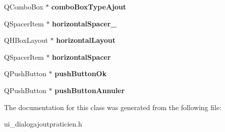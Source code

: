 \begin{DoxyCompactItemize}
\item 
\hypertarget{classUi__DialogAjoutPraticien_a2e7a425602b6e23d6068265cfcc4d961}{Q\-Combo\-Box $\ast$ {\bfseries combo\-Box\-Type\-Ajout}}\label{classUi__DialogAjoutPraticien_a2e7a425602b6e23d6068265cfcc4d961}

\item 
\hypertarget{classUi__DialogAjoutPraticien_aa2a7c8f18310b44604ca1a5b8b520c95}{Q\-Spacer\-Item $\ast$ {\bfseries horizontal\-Spacer\-\_}}\label{classUi__DialogAjoutPraticien_aa2a7c8f18310b44604ca1a5b8b520c95}

\item 
\hypertarget{classUi__DialogAjoutPraticien_a928ac02d32e4457f87e43a2456dc9562}{Q\-H\-Box\-Layout $\ast$ {\bfseries horizontal\-Layout}}\label{classUi__DialogAjoutPraticien_a928ac02d32e4457f87e43a2456dc9562}

\item 
\hypertarget{classUi__DialogAjoutPraticien_ae4d9e986c0cce4383e680a8a86c174e0}{Q\-Spacer\-Item $\ast$ {\bfseries horizontal\-Spacer}}\label{classUi__DialogAjoutPraticien_ae4d9e986c0cce4383e680a8a86c174e0}

\item 
\hypertarget{classUi__DialogAjoutPraticien_a2150d83dc01d3cc1f1f24fa30a92e3a1}{Q\-Push\-Button $\ast$ {\bfseries push\-Button\-Ok}}\label{classUi__DialogAjoutPraticien_a2150d83dc01d3cc1f1f24fa30a92e3a1}

\item 
\hypertarget{classUi__DialogAjoutPraticien_aa7464546e4e7aca5c52f07629e97b063}{Q\-Push\-Button $\ast$ {\bfseries push\-Button\-Annuler}}\label{classUi__DialogAjoutPraticien_aa7464546e4e7aca5c52f07629e97b063}

\end{DoxyCompactItemize}


The documentation for this class was generated from the following file\-:\begin{DoxyCompactItemize}
\item 
ui\-\_\-dialogajoutpraticien.\-h\end{DoxyCompactItemize}
